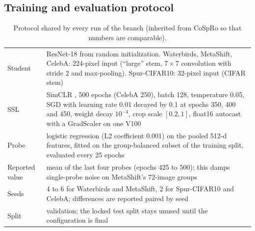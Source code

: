 \documentclass[11pt]{article}
\begin{document}
\subsection{Training and evaluation protocol}
\begin{table}[H]
\centering
\caption{Protocol shared by every run of the branch (inherited from CoSpRo so that numbers are comparable).}
\small
\begin{tabularx}{\linewidth}{l X}
\toprule
Student & ResNet-18 \citep{he2016resnet} from random initialization. Waterbirds, MetaShift, CelebA: 224-pixel input (``large'' stem, $7\times7$ convolution with stride 2 and max-pooling). Spur-CIFAR10: 32-pixel input (CIFAR stem) \\
SSL & SimCLR \citep{chen2020simclr}, 500 epochs (CelebA 250), batch 128, temperature 0.05, SGD with learning rate 0.01 decayed by 0.1 at epochs 350, 400 and 450, weight decay $10^{-4}$, crop scale $[0.2,1]$, float16 autocast with a GradScaler \citep{micikevicius2018mixed} on one V100 \\
Probe & logistic regression (L2 coefficient 0.001) on the pooled 512-d features, fitted on the group-balanced subset of the training split, evaluated every 25 epochs \\
Reported value & mean of the last four probes (epochs 425 to 500); this damps single-probe noise on MetaShift's 72-image groups \\
Seeds & 4 to 6 for Waterbirds and MetaShift, 2 for Spur-CIFAR10 and CelebA; differences are reported paired by seed \citep{bouthillier2021variance} \\
Split & validation; the locked test split stays unused until the configuration is final \citep{gulrajani2021lost} \\
\bottomrule
\end{tabularx}
\end{table}
\end{document}
